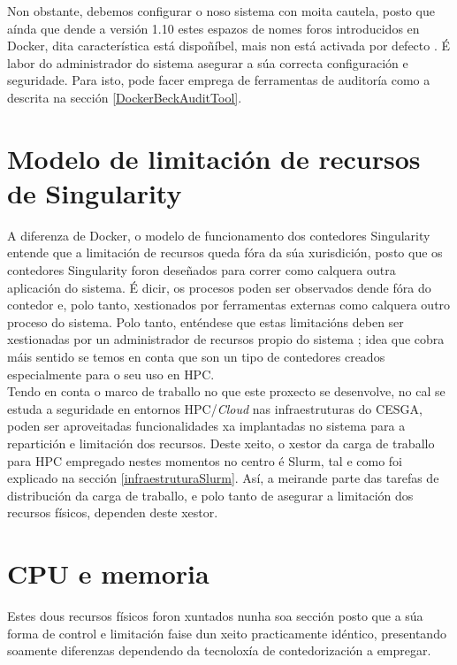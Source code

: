 Non obstante, debemos configurar o noso sistema con moita cautela, posto que aínda que dende a versión 1.10 estes espazos de nomes foros introducidos en Docker, dita característica está dispoñíbel, mais non está activada por defecto \cite{docker-security}. É labor do administrador do sistema asegurar a súa correcta configuración e seguridade. Para isto, pode facer emprega de ferramentas de auditoría como a descrita na sección \ref{DockerBeckAuditTool}.

\section{Modelo de limitación de recursos de Singularity}
\label{modeloLimitacionRecursosSingularity}

A diferenza de Docker, o modelo de funcionamento dos contedores Singularity entende que a limitación de recursos queda fóra da súa xurisdición, posto que os contedores Singularity foron deseñados para correr como calquera outra aplicación do sistema. É dicir, os procesos poden ser observados dende fóra do contedor e, polo tanto, xestionados por ferramentas externas como calquera outro proceso do sistema. Polo tanto, enténdese que estas limitacións deben ser xestionadas por un administrador de recursos propio do sistema \cite{singularity-limits}; idea que cobra máis sentido se temos en conta que son un tipo de contedores creados especialmente para o seu uso en \gls{HPC}.\\

Tendo en conta o marco de traballo no que este proxecto se desenvolve, no cal se estuda a seguridade en entornos \gls{HPC}/\textit{Cloud} nas infraestruturas do \gls{CESGA}, poden ser aproveitadas funcionalidades xa implantadas no sistema para a repartición e limitación dos recursos. Deste xeito, o xestor da carga de traballo para \gls{HPC} empregado nestes momentos no centro é Slurm, tal e como foi explicado na sección \ref{infraestruturaSlurm}. Así, a meirande parte das tarefas de distribución da carga de traballo, e polo tanto de asegurar a limitación dos recursos físicos, dependen deste xestor.

\section{CPU e memoria}

Estes dous recursos físicos foron xuntados nunha soa sección posto que a súa forma de control e limitación faise dun xeito practicamente idéntico, presentando soamente diferenzas dependendo da tecnoloxía de contedorización a empregar.

